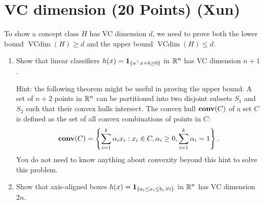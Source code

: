 \section{VC dimension (20 Points) (Xun)}

\newcommand{\vcdim}{\mathop{\mathrm{VCdim}}}

To show a concept class $ H $ has VC dimension $ d $, we need to prove both the lower bound $ \vcdim (H) \ge d $ and the upper bound $ \vcdim (H) \le d$.

\begin{enumerate}
\item 
Show that linear classifiers $ h(x) = \mathbf{1}_{\left\lbrace a^\top x + b \ge 0 \right\rbrace} $ in $ \mathbb{R}^n $ has VC dimension $ n+1 $.

Hint: the following theorem might be useful in proving the upper bound.
A set of $ n+2 $ points in  $ \mathbb{R}^n $ can be partitioned into two disjoint subsets $ S_1 $ and $ S_2 $ such that their convex hulls intersect. 
The convex hull $ \mathbf{conv} (C) $ of a set $ C $ is defined as the set of all convex combinations of points in $ C $: 
\begin{align}
\mathbf{conv} (C) = \left\lbrace \sum_{i=1}^{k} \alpha_i x_i:  x_i \in C, \alpha_i \ge 0, \sum_{i=1}^{k} \alpha_i = 1  \right\rbrace. 
\end{align}
You do not need to know anything about convexity beyond this hint to solve this problem. 


\item 
Show that axis-aligned boxes $ h(x) = \mathbf{1}_{\left\lbrace a_i \le x_i \le b_i, \forall i \right\rbrace} $ in $ \mathbb{R}^n $ has VC dimension $ 2n $. 


\end{enumerate}










